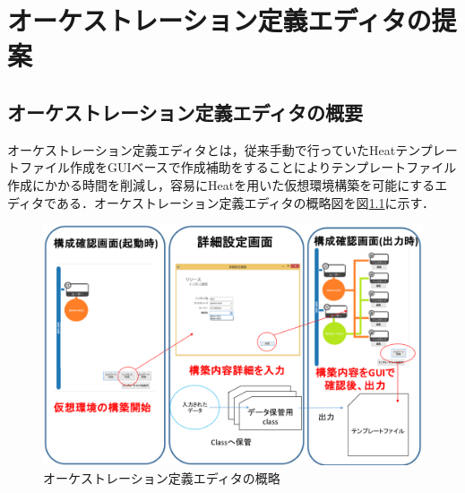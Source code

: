 \documentclass[mingoth]{kut-paper}		%
\begin{document}
	
	
\chapter{オーケストレーション定義エディタの提案}
%
	\section{オーケストレーション定義エディタの概要}
		オーケストレーション定義エディタとは，従来手動で行っていたHeatテンプレートファイル作成をGUIベースで作成補助をすることによりテンプレートファイル作成にかかる時間を削減し，容易にHeatを用いた仮想環境構築を可能にするエディタである．オーケストレーション定義エディタの概略図を図\ref{graf:2}に示す．
		\vspace{-2mm}
		\begin{figure}[H]
			\begin{center}
				\includegraphics[scale=0.4]{Document/GUIEditorOverview.eps}
				\caption{オーケストレーション定義エディタの概略}
				\label{graf:2}
			\end{center}
		\end{figure}
\end{document}
